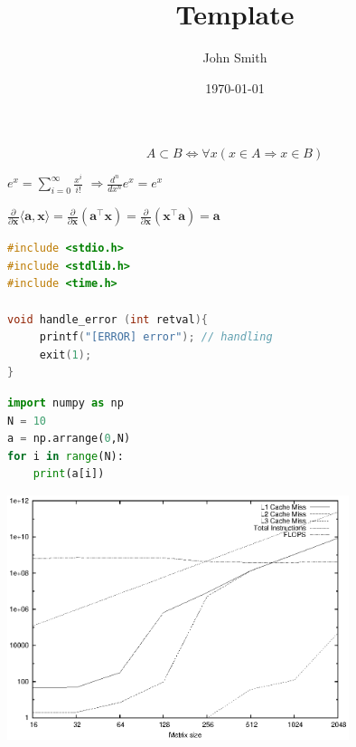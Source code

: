 \documentclass[a4j]{jarticle}
\title{Template}
\author{John Smith}
\date{\today}
\let \ds \displaystyle
\begin{document}
\maketitle
\pagebreak


\newcommand{\idiff}[3]{
  \frac{d^{#1} #2}{d #3^{#1}}
}
\newcommand{\diff}[3]{
  \frac{\mathrm{d}^{#1} #2}{\mathrm{d} #3^{#1}}
}
\newcommand{\pdiff}[3]{
  \frac{\partial^{#1} #2}{\partial #3^{#1}}
}



$$ A \subset B \Leftrightarrow \forall x ( x \in A \Rightarrow x \in B) $$

$\displaystyle  e^x = \sum_{i=0}^\infty \frac{x^i}{i!}$  $ \Rightarrow \idiff{n}{}{x} e^x = e^x$

$\ds \pdiff{}{}{\bm{x}}\langle \bm{a},\bm{x} \rangle =\frac{\partial}{\partial \bm{x}} \left( \bm{a}^\top \bm{x}\right)= \frac{\partial}{\partial \bm{x}} \left( \bm{x}^\top \bm{a}\right) = \bm{a}$

\begin{lstlisting}[language=C]
#include <stdio.h>
#include <stdlib.h>
#include <time.h>

void handle_error (int retval){
     printf("[ERROR] error"); // handling
     exit(1);
}
\end{lstlisting}
\begin{lstlisting}[language=Python]
import numpy as np
N = 10
a = np.arrange(0,N)
for i in range(N):
    print(a[i])
\end{lstlisting}
\includegraphics[width=10cm]{template.eps}
\pagebreak
\end{document}
